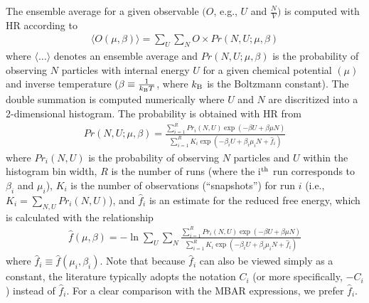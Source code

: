 \documentclass[journal=jced,manuscript=article]{achemso}
\begin{document}
The ensemble average for a given observable $(O$, e.g., $U$ and $\frac{N}{V})$ is computed with HR according to
\begin{eqnarray} \label{eq: HR ave}
\langle O(\mu,\beta) \rangle = \sum_{U} \sum_{N} O \times Pr(N,U;\mu,\beta)
\end{eqnarray}
where $\langle \dots \rangle$ denotes an ensemble average and $Pr(N,U;\mu,\beta)$ is the probability of observing $N$ particles with internal energy $U$ for a given chemical potential $(\mu)$ and inverse temperature $(\beta \equiv \frac{1}{k_{\rm B}T}$, where $k_{\rm B}$ is the Boltzmann constant). The double summation is computed numerically where $U$ and $N$ are discritized into a 2-dimensional histogram. The probability is obtained with HR from
\begin{eqnarray} \label{eq: HR prob}
Pr(N,U;\mu,\beta) = \frac{\sum_{i=1}^{R} Pr_i(N,U)  \exp(-\beta U + \beta \mu N)}{\sum_{i=1}^{R} K_i \exp(-\beta_i U + \beta_i \mu_i N + \hat f_i)}
\end{eqnarray}
where $Pr_i(N,U)$ is the probability of observing $N$ particles and $U$ within the histogram bin width, $R$ is the number of runs (where the i$^{\rm th}$ run corresponds to $\beta_i$ and $\mu_i$), $K_{i}$ is the number of observations (``snapshots'') for run $i$ (i.e., $K_{i} = \sum_{N,U} Pr_i(N,U)$), and $\hat f_i$ is an estimate for the reduced free energy, which is calculated with the relationship
\begin{eqnarray} \label{eq: Weights}
\hat f(\mu,\beta) = - \ln \sum_{U} \sum_{N} \frac{\sum_{i=1}^{R} Pr_i(N,U) \exp(-\beta U + \beta \mu N)}{\sum_{i=1}^{R} K_i \exp(-\beta_i U + \beta_i \mu_i N + \hat f_i)}
\end{eqnarray}
where $\hat f_i \equiv \hat f(\mu_i,\beta_i)$. Note that because $\hat f_i$ can also be viewed simply as a constant, the literature typically adopts the notation $C_i$ (or more specifically, $-C_i$) instead of $\hat f_i$. For a clear comparison with the MBAR expressions, we prefer $\hat f_i$.
\end{document}
